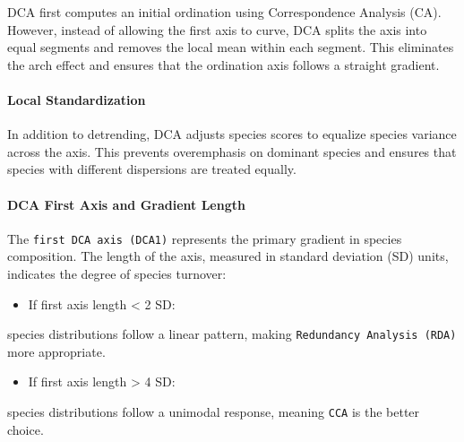\documentclass[
]{article}
\providecommand{\tightlist}{%
  \setlength{\itemsep}{0pt}\setlength{\parskip}{0pt}}
\begin{document}
DCA first computes an initial ordination using Correspondence Analysis
(CA). However, instead of allowing the first axis to curve, DCA splits
the axis into equal segments and removes the local mean within each
segment. This eliminates the arch effect and ensures that the ordination
axis follows a straight gradient.

\hypertarget{local-standardization}{%
\paragraph{Local Standardization}\label{local-standardization}}

In addition to detrending, DCA adjusts species scores to equalize
species variance across the axis. This prevents overemphasis on dominant
species and ensures that species with different dispersions are treated
equally.

\hypertarget{dca-first-axis-and-gradient-length}{%
\paragraph{DCA First Axis and Gradient
Length}\label{dca-first-axis-and-gradient-length}}

The \texttt{first\ DCA\ axis\ (DCA1)} represents the primary gradient in
species composition. The length of the axis, measured in standard
deviation (SD) units, indicates the degree of species turnover:

\begin{itemize}
\tightlist
\item
  If first axis length \textless{} 2 SD:
\end{itemize}

species distributions follow a linear pattern, making
\texttt{Redundancy\ Analysis\ (RDA)} more appropriate.

\begin{itemize}
\tightlist
\item
  If first axis length \textgreater{} 4 SD:
\end{itemize}

species distributions follow a unimodal response, meaning \texttt{CCA}
is the better choice.
\end{document}
